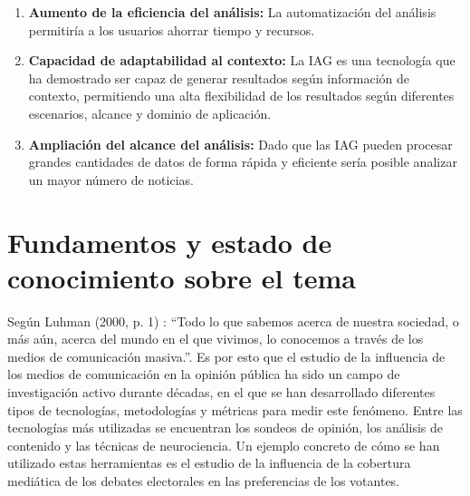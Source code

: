 \documentclass[12pt]{article}
\begin{document}
\begin{enumerate}
    \item \textbf{Aumento de la eficiencia del análisis:} La automatización del análisis permitiría a los usuarios ahorrar tiempo y recursos. 

    \item \textbf{Capacidad de adaptabilidad al contexto:} La IAG es una tecnología que ha demostrado ser capaz de generar resultados según información de contexto, permitiendo una alta flexibilidad de los resultados según diferentes escenarios, alcance y dominio de aplicación. 

    \item \textbf{Ampliación del alcance del análisis:} Dado que las IAG pueden procesar grandes cantidades de datos de forma rápida y eficiente sería posible analizar un mayor número de noticias.

\end{enumerate}


\section{Fundamentos y estado de conocimiento sobre el tema}

%


Según Luhman (2000, p. 1) \cite{luhmann2000}: ``Todo lo que sabemos acerca de nuestra sociedad, o más aún, acerca del mundo en el que vivimos, lo conocemos a través de los medios de comunicación masiva.''. Es por esto que el estudio de la influencia de los medios de comunicación en la opinión pública ha sido un campo de investigación activo durante décadas, en el que se han desarrollado diferentes tipos de tecnologías, metodologías y métricas para medir este fenómeno. Entre las tecnologías más utilizadas se encuentran los sondeos de opinión, los análisis de contenido y las técnicas de neurociencia. Un ejemplo concreto de cómo se han utilizado estas herramientas es el estudio de la influencia de la cobertura mediática de los debates electorales en las preferencias de los votantes. 

\end{document}
